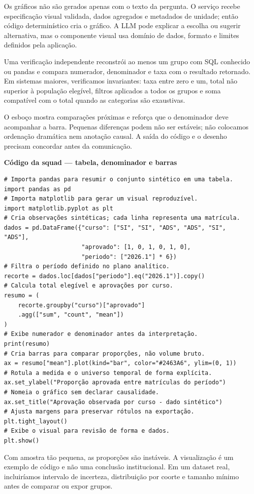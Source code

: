 Os gráficos não são gerados apenas com o texto da pergunta. O serviço recebe especificação visual validada, dados agregados e metadados de unidade; então código determinístico cria o gráfico. A LLM pode explicar a escolha ou sugerir alternativa, mas o componente visual usa domínio de dados, formato e limites definidos pela aplicação.

Uma verificação independente reconstrói ao menos um grupo com SQL conhecido ou pandas e compara numerador, denominador e taxa com o resultado retornado. Em sistemas maiores, verificamos invariantes: taxa entre zero e um, total não superior à população elegível, filtros aplicados a todos os grupos e soma compatível com o total quando as categorias são exaustivas.

O esboço mostra comparações próximas e reforça que o denominador deve acompanhar a barra. Pequenas diferenças podem não ser estáveis; não colocamos ordenação dramática nem anotação causal. A saída do código e o desenho precisam concordar antes da comunicação.

\textbf{Código da squad --- tabela, denominador e barras}
\begin{verbatim}
# Importa pandas para resumir o conjunto sintético em uma tabela.
import pandas as pd
# Importa matplotlib para gerar um visual reproduzível.
import matplotlib.pyplot as plt
# Cria observações sintéticas; cada linha representa uma matrícula.
dados = pd.DataFrame({"curso": ["SI", "SI", "ADS", "ADS", "SI", "ADS"],
                      "aprovado": [1, 0, 1, 0, 1, 0],
                      "periodo": ["2026.1"] * 6})
# Filtra o período definido no plano analítico.
recorte = dados.loc[dados["periodo"].eq("2026.1")].copy()
# Calcula total elegível e aprovações por curso.
resumo = (
    recorte.groupby("curso")["aprovado"]
    .agg(["sum", "count", "mean"])
)
# Exibe numerador e denominador antes da interpretação.
print(resumo)
# Cria barras para comparar proporções, não volume bruto.
ax = resumo["mean"].plot(kind="bar", color="#2463A6", ylim=(0, 1))
# Rotula a medida e o universo temporal de forma explícita.
ax.set_ylabel("Proporção aprovada entre matrículas do período")
# Nomeia o gráfico sem declarar causalidade.
ax.set_title("Aprovação observada por curso - dado sintético")
# Ajusta margens para preservar rótulos na exportação.
plt.tight_layout()
# Exibe o visual para revisão de forma e dados.
plt.show()
\end{verbatim}

Com amostra tão pequena, as proporções são instáveis. A visualização é um exemplo de código e não uma conclusão institucional. Em um dataset real, incluiríamos intervalo de incerteza, distribuição por coorte e tamanho mínimo antes de comparar ou expor grupos.

